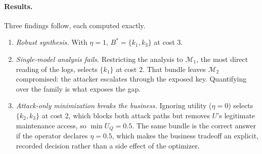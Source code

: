 \documentclass[11pt,letterpaper]{article}
\theoremstyle{definition}
\newcommand{\Mod}{\mathcal{M}}
\begin{document}
\paragraph{Results.} Three findings follow, each computed exactly.
\begin{enumerate}[leftmargin=1.5em,itemsep=1pt]
\item \emph{Robust synthesis.} With $\eta=1$, $B^{*}=\{k_1,k_3\}$ at cost 3.
\item \emph{Single-model analysis fails.} Restricting the analysis to $\Mod_1$, the most direct reading of the logs, selects $\{k_1\}$ at cost 2. That bundle leaves $\Mod_2$ compromised: the attacker escalates through the exposed key. Quantifying over the family is what exposes the gap.
\item \emph{Attack-only minimization breaks the business.} Ignoring utility ($\eta=0$) selects $\{k_2,k_3\}$ at cost 2, which blocks both attack paths but removes $U$'s legitimate maintenance access, so $\min U_Q=0.5$. The same bundle is the correct answer if the operator declares $\eta=0.5$, which makes the business tradeoff an explicit, recorded decision rather than a side effect of the optimizer.
\end{enumerate}
\end{document}
